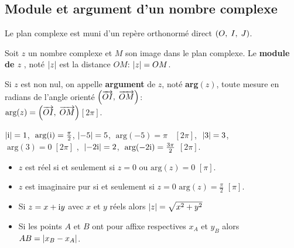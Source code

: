         \subsection*{ Module et argument   d'un  nombre complexe}
        \begin{definition}
        Le plan complexe est muni d'un repère orthonormé  direct $ \left(O,\; I, \; J\right) $. 
        \begin{description}
        \item Soit $ z $ un nombre complexe et  $ M $  son image dans le plan complexe.
        Le \textbf{module de $ z $} , noté $ \left\lvert z \right\rvert $ est la distance $ OM $:\;  $ \left\lvert z \right\rvert=OM $.
        \item Si $ z $  est non nul, on appelle \textbf{argument} de $ z $, noté \textbf{arg}$ (z) $, toute mesure en radians de l'angle orienté $ \left( \overrightarrow{OI},\;\overrightarrow{OM} \right) $: \\  $ \text{arg}(z)= \left( \overrightarrow{OI},\;\overrightarrow{OM} \right)$\quad $ [2\pi] $.
        \end{description}
        \end{definition}
       
       \begin{example}
       $  \left\lvert \text{i} \right\rvert=1 $,  $ \;\text{arg}(\text{i}) =\frac{\pi}{2}$, $ \left\lvert -5 \right\rvert=5 $,  $ \;\text{arg}(-5) =\pi$ $\;\; [2\pi] $, $\;  \left\lvert 3 \right\rvert=3$, $ \;\text{arg}(3) =0\;  [2\pi] $ 
, $\;  \left\lvert -2\text{i} \right\rvert=2 $,  $\; \text{arg}(-2\text{i}) =\frac{3\pi}{2}$\: $[2\pi] $.
\end{example}

\begin{corollary}
     \begin{itemize}
\item $ z $  est réel si et seulement si  $ z=0 $ ou $ \text{arg}(z) =0$\: $[\pi] $.
\item $ z $  est imaginaire pur si et seulement si $ z=0 $  $ \text{arg}(z) =\frac{\pi}{2}$\: $[\pi] $.
\end{itemize}
  \end{corollary}
\begin{remark}
\begin{itemize}
\item Si $ z=x+\text{i} y $  avec $x $ et $y $ réels alors $ \left\lvert z \right\rvert=\sqrt{x^2+y^2} $
\item Si les points $A $ et $ B$ ont pour affixe respectives $ x_A$ et $y_B $ alors $ AB=\left\lvert x_B - x_A \right\rvert $.
\end{itemize}
\end{remark}
